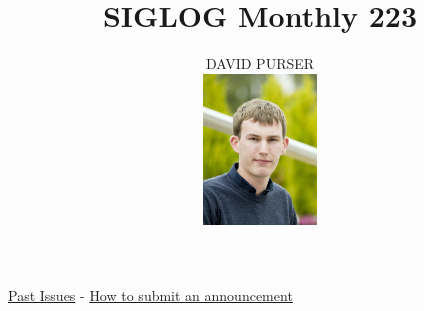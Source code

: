 \documentclass[prodmode,acmtecs]{acmsmall} %
\newcounter{colstart}
\begin{document}
\setcounter{colstart}{\thepage}

\title{\huge\sc SIGLOG Monthly 223}
\author{DAVID PURSER
\vspace*{-2.6cm}\begin{flushright}\includegraphics[width=30mm]{dp}\end{flushright}
}

\maketitlee

\href{https://lics.siglog.org/newsletters/}{Past Issues}
 - 
\href{https://lics.siglog.org/newsletters/inst.html}{How to submit an announcement}
\end{document}
